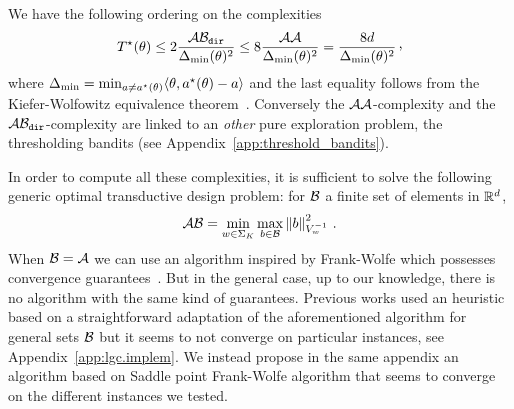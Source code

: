 We have the following ordering on the complexities
\begin{align}\label{eq:complexities}
\Tstar(\theta) \leq 2 \frac{\xyopt}{\DeltaMin(\theta)^2}\leq 8 \frac{\gopt}{\DeltaMin(\theta)^2} = \frac{8d}{\DeltaMin(\theta)^2}\,\CommaBin
\end{align}
where $\Delta_\text{min} = \min_{a\neq a^\star(\theta)}\langle\theta,a^\star(\theta)-a\rangle$ and  the last equality follows from the Kiefer-Wolfowitz equivalence theorem~\citep{kiefer1959}. Conversely the $\mathcal{A}\mathcal{A}$-complexity and the $\mathcal{A}\mathcal{B}_{\texttt{dir}}$-complexity are linked to an \emph{other} pure exploration problem, the thresholding bandits (see Appendix~\ref{app:threshold_bandits}).

\begin{remark}
In order to compute all these complexities, it is sufficient to solve the following generic optimal transductive design problem: for $\mathcal{B}$ a finite set of elements in $\mathbb{R}^d$,
\[
\mathcal{A}\mathcal{B}=\min_{w\in\Sigma_K}\max_{b\in\mathcal{B}}\left\lVert b\right\rVert^2_{V_w^{-1}}\,.
\]
When $\mathcal{B}=\mathcal{A}$ we can use an algorithm inspired by Frank-Wolfe \citep{frank1956algorithm} which possesses convergence guarantees~\citep{atwood1969optimal,ahipasaoglu2008fw}. But in the general case, up to our knowledge, there is no algorithm with the same kind of guarantees. Previous works used an heuristic based on a straightforward adaptation of the aforementioned algorithm for general sets $\mathcal{B}$ but it seems to not converge on particular instances, see Appendix~\ref{app:lgc.implem}. We instead propose in the same appendix an algorithm based on Saddle point Frank-Wolfe algorithm that seems to converge on the different instances we tested.
\end{remark}

